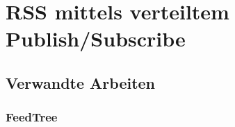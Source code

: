 \chapter{RSS mittels verteiltem Publish/Subscribe}


\section{Verwandte  Arbeiten}
\subsection{FeedTree}
